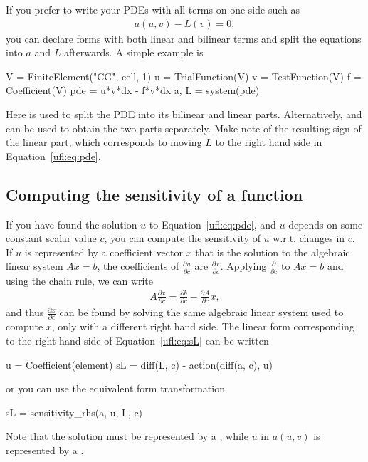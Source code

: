 If you prefer to write your PDEs with all terms on one side such as
\begin{align}\label{ufl:eq:pde}
a(u, v) - L(v) = 0,
\end{align}
you can declare forms with both linear and bilinear terms
and split the equations into $a$ and $L$ afterwards.
A simple example is
\begin{python}
V = FiniteElement("CG", cell, 1)
u = TrialFunction(V)
v = TestFunction(V)
f = Coefficient(V)
pde = u*v*dx - f*v*dx
a, L = system(pde)
\end{python}
Here  is used to split the PDE into its bilinear and
linear parts. Alternatively,  and  can be used
to obtain the two parts separately. Make note of the resulting sign
of the linear part, which corresponds to moving $L$ to the right
hand side in Equation~\eqref{ufl:eq:pde}.

\subsection{Computing the sensitivity of a function} \label{ufl:sec:sensitivity}
If you have found the solution $u$ to Equation~\eqref{ufl:eq:pde}, and
$u$ depends on some constant scalar value $c$, you can compute the
sensitivity of $u$ w.r.t. changes in $c$.  If $u$ is represented by a
coefficient vector $x$ that is the solution to the algebraic linear
system $A x = b$, the coefficients of $\frac{\partial u}{\partial c}$
are $\frac{\partial x}{\partial c}$.  Applying $\frac{\partial
}{\partial c}$ to $A x = b$ and using the chain rule, we can write
\begin{align}\label{ufl:eq:sL}
A \frac{\partial x}{\partial c} = \frac{\partial b}{\partial c} - \frac{\partial A}{\partial c} x,
\end{align}
and thus $\frac{\partial x}{\partial c}$ can be found by solving the
same algebraic linear system used to compute $x$, only with a
different right hand side.  The linear form corresponding to the right
hand side of Equation~\eqref{ufl:eq:sL} can be written
\begin{python}
u = Coefficient(element)
sL = diff(L, c) - action(diff(a, c), u)
\end{python}
or you can use the equivalent form transformation
\begin{python}
sL = sensitivity_rhs(a, u, L, c)
\end{python}
Note that the solution  must be represented by a
, while $u$ in $a(u, v)$ is represented
by a .


